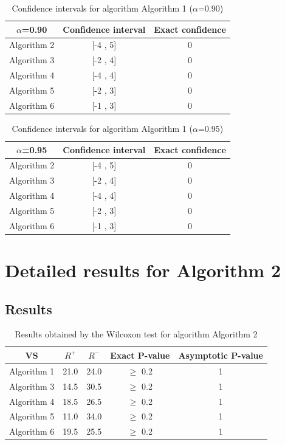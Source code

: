 \documentclass[a4paper,10pt]{article}
\begin{document}
\begin{table}[!htp]
\centering\small
\begin{tabular}{
|c|c|c|}
\hline
 $\alpha$=0.90 & Confidence interval & Exact confidence \\ \hline 
Algorithm 2 & [-4 , 5] & 0\\ \hline 
Algorithm 3 & [-2 , 4] & 0\\ \hline 
Algorithm 4 & [-4 , 4] & 0\\ \hline 
Algorithm 5 & [-2 , 3] & 0\\ \hline 
Algorithm 6 & [-1 , 3] & 0\\ \hline 

\end{tabular}
\caption{Confidence intervals for algorithm Algorithm 1 ($\alpha$=0.90)}
\end{table}
\begin{table}[!htp]
\centering\small
\begin{tabular}{
|c|c|c|}
\hline
 $\alpha$=0.95 & Confidence interval & Exact confidence \\ \hline 
Algorithm 2 & [-4 , 5] & 0\\ \hline 
Algorithm 3 & [-2 , 4] & 0\\ \hline 
Algorithm 4 & [-4 , 4] & 0\\ \hline 
Algorithm 5 & [-2 , 3] & 0\\ \hline 
Algorithm 6 & [-1 , 3] & 0\\ \hline 

\end{tabular}
\caption{Confidence intervals for algorithm Algorithm 1 ($\alpha$=0.95)}
\end{table}

 \clearpage 


\section{Detailed results for Algorithm 2}


\subsection{Results}

\begin{table}[!htp]
\centering\small
\begin{tabular}{
|c|c|c|c|c|}
\hline
 VS & $R^{+}$ & $R^{-}$ & Exact P-value & Asymptotic P-value \\ \hline 
Algorithm 1 & 21.0 & 24.0 & $\geq$ 0.2 & 1\\ \hline 
Algorithm 3 & 14.5 & 30.5 & $\geq$ 0.2 & 1\\ \hline 
Algorithm 4 & 18.5 & 26.5 & $\geq$ 0.2 & 1\\ \hline 
Algorithm 5 & 11.0 & 34.0 & $\geq$ 0.2 & 1\\ \hline 
Algorithm 6 & 19.5 & 25.5 & $\geq$ 0.2 & 1\\ \hline 

\end{tabular}
\caption{Results obtained by the Wilcoxon test for algorithm Algorithm 2}
\end{table}
\end{document}
